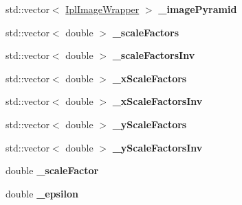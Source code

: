 \begin{DoxyCompactItemize}
\item 
\hypertarget{class_ipl_image_pyramid_a955920b32dfdc955aa944df3c05faafe}{
std::vector$<$ \hyperlink{class_ipl_image_wrapper}{IplImageWrapper} $>$ {\bfseries \_\-imagePyramid}}
\label{class_ipl_image_pyramid_a955920b32dfdc955aa944df3c05faafe}

\item 
\hypertarget{class_ipl_image_pyramid_a31cbc9447ef67d2a3a964a5a60dd4886}{
std::vector$<$ double $>$ {\bfseries \_\-scaleFactors}}
\label{class_ipl_image_pyramid_a31cbc9447ef67d2a3a964a5a60dd4886}

\item 
\hypertarget{class_ipl_image_pyramid_a35aff3d534d915fd474eeb0ad5607f87}{
std::vector$<$ double $>$ {\bfseries \_\-scaleFactorsInv}}
\label{class_ipl_image_pyramid_a35aff3d534d915fd474eeb0ad5607f87}

\item 
\hypertarget{class_ipl_image_pyramid_a0e50ac4b9d85cb4c18b59c60a6dfc912}{
std::vector$<$ double $>$ {\bfseries \_\-xScaleFactors}}
\label{class_ipl_image_pyramid_a0e50ac4b9d85cb4c18b59c60a6dfc912}

\item 
\hypertarget{class_ipl_image_pyramid_ae5f60db1b4376a1124180562286e4bd4}{
std::vector$<$ double $>$ {\bfseries \_\-xScaleFactorsInv}}
\label{class_ipl_image_pyramid_ae5f60db1b4376a1124180562286e4bd4}

\item 
\hypertarget{class_ipl_image_pyramid_a39632fcf24b301d223a3364df9ab5dd5}{
std::vector$<$ double $>$ {\bfseries \_\-yScaleFactors}}
\label{class_ipl_image_pyramid_a39632fcf24b301d223a3364df9ab5dd5}

\item 
\hypertarget{class_ipl_image_pyramid_acfe9858093ed2e921605bb3a12c5bc3b}{
std::vector$<$ double $>$ {\bfseries \_\-yScaleFactorsInv}}
\label{class_ipl_image_pyramid_acfe9858093ed2e921605bb3a12c5bc3b}

\item 
\hypertarget{class_ipl_image_pyramid_a4ee5eee6fd654f8138d08db682db6898}{
double {\bfseries \_\-scaleFactor}}
\label{class_ipl_image_pyramid_a4ee5eee6fd654f8138d08db682db6898}

\item 
\hypertarget{class_ipl_image_pyramid_ace53a43b5e91c8f3316c131388b11c02}{
double {\bfseries \_\-epsilon}}
\label{class_ipl_image_pyramid_ace53a43b5e91c8f3316c131388b11c02}

\end{DoxyCompactItemize}


